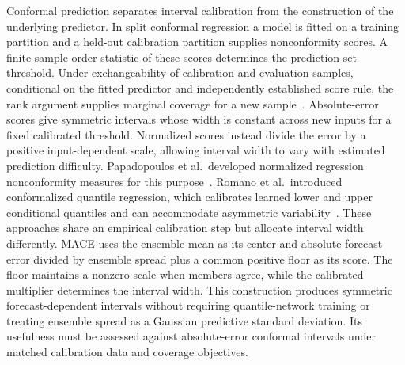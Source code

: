Conformal prediction separates interval calibration from the construction of the underlying predictor. In split conformal regression a model is fitted on a training partition and a held-out calibration partition supplies nonconformity scores. A finite-sample order statistic of these scores determines the prediction-set threshold. Under exchangeability of calibration and evaluation samples, conditional on the fitted predictor and independently established score rule, the rank argument supplies marginal coverage for a new sample~\cite{lei2018regression,angelopoulos2023conformal}. Absolute-error scores give symmetric intervals whose width is constant across new inputs for a fixed calibrated threshold. Normalized scores instead divide the error by a positive input-dependent scale, allowing interval width to vary with estimated prediction difficulty. Papadopoulos et al.\ developed normalized regression nonconformity measures for this purpose~\cite{papadopoulos2008normalized}. Romano et al.\ introduced conformalized quantile regression, which calibrates learned lower and upper conditional quantiles and can accommodate asymmetric variability~\cite{romano2019cqr}. These approaches share an empirical calibration step but allocate interval width differently. MACE uses the ensemble mean as its center and absolute forecast error divided by ensemble spread plus a common positive floor as its score. The floor maintains a nonzero scale when members agree, while the calibrated multiplier determines the interval width. This construction produces symmetric forecast-dependent intervals without requiring quantile-network training or treating ensemble spread as a Gaussian predictive standard deviation. Its usefulness must be assessed against absolute-error conformal intervals under matched calibration data and coverage objectives.

